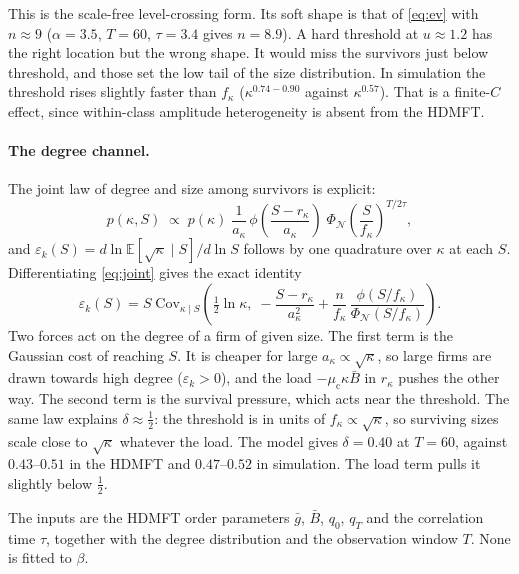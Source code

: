 \documentclass[11pt]{article}
\newcommand{\E}{\mathbb E}
\newcommand{\mc}{\mu_{\mathrm c}}
\theoremstyle{remark}
\begin{document}
This is the scale-free level-crossing form.  Its soft shape is that of \eqref{eq:ev} with
$n\approx9$ ($\alpha=3.5$, $T=60$, $\tau=3.4$ gives $n=8.9$).  A hard threshold at $u\approx1.2$
has the right location but the wrong shape.  It would miss the survivors just below threshold,
and those set the low tail of the size distribution.  In simulation the threshold rises slightly
faster than $f_\kappa$ ($\kappa^{0.74-0.90}$ against $\kappa^{0.57}$).  That is a finite-$C$
effect, since within-class amplitude heterogeneity is absent from the HDMFT.

\paragraph{The degree channel.}
The joint law of degree and size among survivors is explicit:
\begin{equation}
  p(\kappa,S)\;\propto\;p(\kappa)\;\frac1{a_\kappa}\,
  \phi\!\left(\frac{S-r_\kappa}{a_\kappa}\right)\;
  \Phi_{\mathcal N}\!\left(\frac{S}{f_\kappa}\right)^{T/2\tau},
  \label{eq:joint}
\end{equation}
and $\varepsilon_k(S)=d\ln\E[\sqrt\kappa\mid S]/d\ln S$ follows by one quadrature over $\kappa$
at each $S$.  Differentiating \eqref{eq:joint} gives the exact identity
\begin{equation}
  \varepsilon_k(S)=S\;\mathrm{Cov}_{\kappa\mid S}\!\left(\tfrac12\ln\kappa,\;
     -\frac{S-r_\kappa}{a_\kappa^2}+\frac{n}{f_\kappa}\,
     \frac{\phi(S/f_\kappa)}{\Phi_{\mathcal N}(S/f_\kappa)}\right).
  \label{eq:eps-cov}
\end{equation}
Two forces act on the degree of a firm of given size.  The first term is the Gaussian cost of
reaching $S$.  It is cheaper for large $a_\kappa\propto\sqrt\kappa$, so large firms are drawn
towards high degree ($\varepsilon_k>0$), and the load $-\mc\kappa\bar B$ in $r_\kappa$ pushes the
other way.  The second term is the survival pressure, which acts near the threshold.  The same
law explains $\delta\approx\tfrac12$: the threshold is in units of $f_\kappa\propto\sqrt\kappa$,
so surviving sizes scale close to $\sqrt\kappa$ whatever the load.  The model gives
$\delta=0.40$ at $T=60$, against $0.43$--$0.51$ in the HDMFT and $0.47$--$0.52$ in simulation.
The load term pulls it slightly below $\tfrac12$.

The inputs are the HDMFT order parameters $\bar g$, $\bar B$, $q_0$, $q_T$ and the correlation
time $\tau$, together with the degree distribution and the observation window $T$.  None is
fitted to $\beta$.
\end{document}
